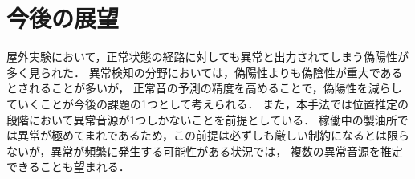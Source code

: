 \documentclass[../main]{subfiles}
\begin{document}
\section{今後の展望}
\label{sec:conc_future}
屋外実験において，正常状態の経路に対しても異常と出力されてしまう偽陽性が多く見られた．
異常検知の分野においては，偽陽性よりも偽陰性が重大であるとされることが多いが，
正常音の予測の精度を高めることで，偽陽性を減らしていくことが今後の課題の1つとして考えられる．
また，本手法では位置推定の段階において異常音源が1つしかないことを前提としている．
稼働中の製油所では異常が極めてまれであるため，この前提は必ずしも厳しい制約になるとは限らないが，異常が頻繁に発生する可能性がある状況では，
複数の異常音源を推定できることも望まれる．
\end{document}
